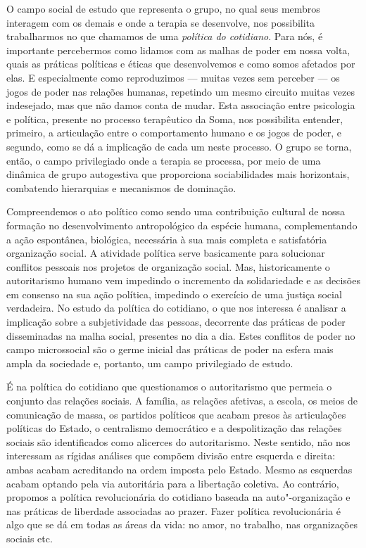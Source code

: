 O campo social de estudo que representa o grupo, no qual seus membros
interagem com os demais e onde a terapia se desenvolve, nos possibilita
trabalharmos no que chamamos de uma \emph{política do cotidiano}. Para
nós, é importante percebermos como lidamos com as malhas de poder em
nossa volta, quais as práticas políticas e éticas que desenvolvemos e
como somos afetados por elas. E especialmente como reproduzimos --- muitas
vezes sem perceber --- os jogos de poder nas relações humanas, repetindo
um mesmo circuito muitas vezes indesejado, mas que não damos conta de
mudar. Esta associação entre psicologia e política, presente no processo
terapêutico da Soma, nos possibilita entender, primeiro, a articulação
entre o comportamento humano e os jogos de poder, e segundo, como se dá
a implicação de cada um neste processo. O grupo se torna, então, o campo
privilegiado onde a terapia se processa, por meio de uma dinâmica de
grupo autogestiva que proporciona sociabilidades mais horizontais,
combatendo hierarquias e mecanismos de dominação.

Compreendemos o ato político como sendo uma contribuição cultural de
nossa formação no desenvolvimento antropológico da espécie humana,
complementando a ação espontânea, biológica, necessária à sua mais
completa e satisfatória organização social. A atividade política serve
basicamente para solucionar conflitos pessoais nos projetos de
organização social. Mas, historicamente o autoritarismo humano vem
impedindo o incremento da solidariedade e as decisões em consenso na sua
ação política, impedindo o exercício de uma justiça social verdadeira.
No estudo da política do cotidiano, o que nos interessa é analisar a
implicação sobre a subjetividade das pessoas, decorrente das práticas de
poder disseminadas na malha social, presentes no dia a dia. Estes
conflitos de poder no campo microssocial são o germe inicial das práticas
de poder na esfera mais ampla da sociedade e, portanto, um campo
privilegiado de estudo.

É na política do cotidiano que questionamos o autoritarismo que permeia
o conjunto das relações sociais. A família, as relações afetivas, a
escola, os meios de comunicação de massa, os partidos políticos que
acabam presos às articulações políticas do Estado, o centralismo
democrático e a despolitização das relações sociais são identificados
como alicerces do autoritarismo. Neste sentido, não nos interessam as
rígidas análises que compõem divisão entre esquerda e direita: ambas
acabam acreditando na ordem imposta pelo Estado. Mesmo as esquerdas
acabam optando pela via autoritária para a libertação coletiva. Ao
contrário, propomos a política revolucionária do cotidiano baseada na
auto"-organização e nas práticas de liberdade associadas ao prazer. Fazer
política revolucionária é algo que se dá em todas as áreas da vida: no
amor, no trabalho, nas organizações sociais etc.

